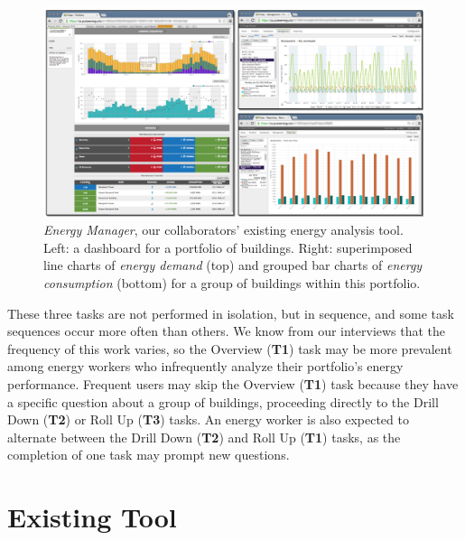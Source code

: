 \documentclass[journal]{vgtc}                %
\newcommand{\bstart}[1]{\vspace{1mm} \noindent{\textbf{#1:}}}
\begin{document}
\begin{figure}[hbp!]
    \vspace{-0.6cm}
	\centering
	\includegraphics[width=\textwidth]{figures/em.pdf}
	\vspace{-0.6cm}
	\caption{\textsl{Energy Manager}, our collaborators' existing energy analysis tool. Left: a dashboard for a portfolio of buildings. Right: superimposed line charts of \textsl{energy demand} (top) and grouped bar charts of \textsl{energy consumption} (bottom) for a group of buildings within this portfolio.}
	\label{fig:energy-manager}
\end{figure} 

\bstart{Task sequences} These three tasks are not performed in isolation, but in sequence, and some task sequences occur more often than others. 
We know from our interviews that the frequency of this work varies, so the Overview ({\bf T1}) task may be more prevalent among energy workers who infrequently analyze their portfolio's energy performance.
Frequent users may skip the Overview ({\bf T1}) task because they have a specific question about a group of buildings, proceeding directly to the Drill Down ({\bf T2}) or Roll Up ({\bf T3}) tasks. 
An energy worker is also expected to alternate between the Drill Down ({\bf T2}) and Roll Up ({\bf T1}) tasks, as the completion of one task may prompt new questions.


\section{Existing Tool}
\label{existing-tool}
\end{document}
